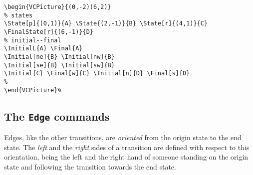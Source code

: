 \documentclass[11pt,twoside]{article}
\newlength{\parindenttemp} %
\newcommand{\noi}{\noindent}
\newlength{\jsIndent}%
\newlength{\ColSource}%
\newlength{\ColFigur}%
\begin{document}
\noi 
\hspace*{-\jsIndent}
\begin{minipage}[t]{\ColFigur}%
\par\vspace*{0mm}%
\bigskip 
\begin{center}
%
\end{center}
\end{minipage}%
\hspace*{1.2em}%
\begin{minipage}[t]{\ColSource}
\setlength{\parindent}{\parindenttemp}%
\par\vspace*{0mm}%
\footnotesize
\begin{verbatim}
\begin{VCPicture}{(0,-2)(6,2)}
% states
\State[p]{(0,1)}{A} \State{(2,-1)}{B} \State[r]{(4,1)}{C}
\FinalState[r]{(6,-1)}{D}
% initial--final
\InitialL{A} \Final{A}
\Initial[ne]{B} \Initial[nw]{B}
\Initial[se]{B} \Initial[sw]{B}
\Initial{C} \Final[w]{C} \Initial[n]{D} \Final[s]{D}
%
\end{VCPicture}%
\end{verbatim}
\normalsize
\end{minipage}%

\subsection{The \texttt{Edge} commands}\label{subsec.edg}

Edges, like the other transitions, are \emph{oriented} from the origin 
state to the end state.
The \emph{left} and the \emph{right} sides of a transition are defined 
with respect to this orientation, being the left and the right hand of 
someone standing on the origin state and following
the transition towards the end state.
\end{document}
